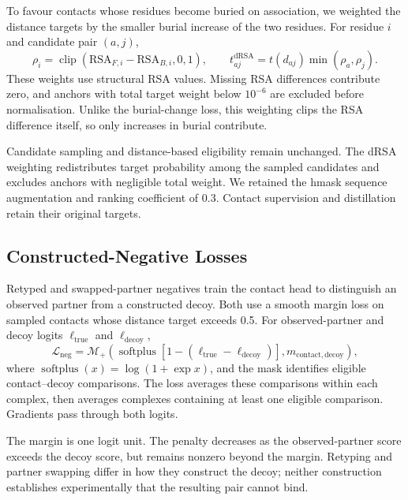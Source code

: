 To favour contacts whose residues become buried on association, we weighted the distance targets by the smaller burial increase of the two residues. For residue $i$ and candidate pair $(a,j)$,
\begin{equation}
    \rho_i=\operatorname{clip}\!\left(
    \mathrm{RSA}_{F,i}-\mathrm{RSA}_{B,i},0,1\right),
    \qquad
    t^{\mathrm{dRSA}}_{aj}=t(d_{aj})\min(\rho_a,\rho_j).
    \label{eq:jaxka-drsa-target}
\end{equation}
These weights use structural RSA values. Missing RSA differences contribute zero, and anchors with total target weight below $10^{-6}$ are excluded before normalisation. Unlike the burial-change loss, this weighting clips the RSA difference itself, so only increases in burial contribute.

Candidate sampling and distance-based eligibility remain unchanged. The dRSA weighting redistributes target probability among the sampled candidates and excludes anchors with negligible total weight. We retained the hmask sequence augmentation and ranking coefficient of 0.3. Contact supervision and distillation retain their original targets.

\subsection{Constructed-Negative Losses}
\label{app:jaxka-negative-losses}

Retyped and swapped-partner negatives train the contact head to distinguish an observed partner from a constructed decoy. Both use a smooth margin loss on sampled contacts whose distance target exceeds 0.5. For observed-partner and decoy logits $\ell_{\mathrm{true}}$ and $\ell_{\mathrm{decoy}}$,
\begin{equation}
    \mathcal L_{\mathrm{neg}}
    =\mathcal M_+\!\left(
    \operatorname{softplus}\!\left[1-(\ell_{\mathrm{true}}-\ell_{\mathrm{decoy}})\right],
    m_{\mathrm{contact,decoy}}
    \right),
    \label{eq:jaxka-negative-loss}
\end{equation}
where $\operatorname{softplus}(x)=\log(1+\exp x)$, and the mask identifies eligible contact--decoy comparisons. The loss averages these comparisons within each complex, then averages complexes containing at least one eligible comparison. Gradients pass through both logits.

The margin is one logit unit. The penalty decreases as the observed-partner score exceeds the decoy score, but remains nonzero beyond the margin. Retyping and partner swapping differ in how they construct the decoy; neither construction establishes experimentally that the resulting pair cannot bind.

